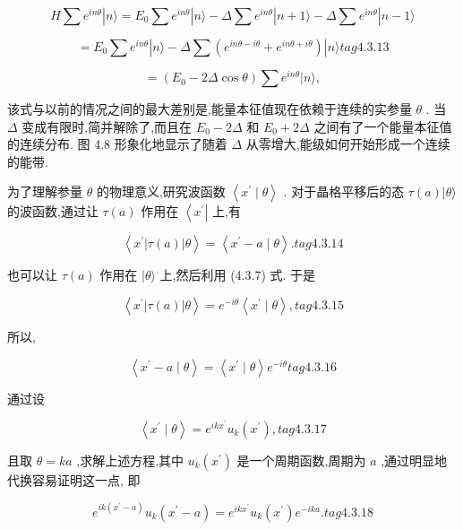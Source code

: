 $$
H\sum {e}^{in\theta }\left| {n\rangle = {E}_{0}\sum {e}^{in\theta }}\right| n\rangle - \Delta \sum {e}^{in\theta }\left| {n + 1\rangle - \Delta \sum {e}^{in\theta }}\right| n - 1\rangle
$$

$$
= {E}_{0}\sum {e}^{in\theta }\left| {n\rangle - \Delta \sum \left( {{e}^{{in\theta } - {i\theta }} + {e}^{{in\theta } + {i\theta }}}\right) }\right| n\rangle tag{4.3.13}
$$

$$
= \left( {{E}_{0} - {2\Delta }\cos \theta }\right) \sum {e}^{in\theta }|n\rangle ,
$$

该式与以前的情况之间的最大差别是,能量本征值现在依赖于连续的实参量 $\theta$ . 当 $\Delta$ 变成有限时,简并解除了,而且在 ${E}_{0} - {2\Delta }$ 和 ${E}_{0} + {2\Delta }$ 之间有了一个能量本征值的连续分布. 图 4.8 形象化地显示了随着 $\Delta$ 从零增大,能级如何开始形成一个连续的能带.

为了理解参量 $\theta$ 的物理意义,研究波函数 $\left\langle {{x}^{\prime } \mid \theta }\right\rangle$ . 对于晶格平移后的态 $\tau \left( a\right) |\theta \rangle$ 的波函数,通过让 $\tau \left( a\right)$ 作用在 $\left\langle {x}^{\prime }\right|$ 上,有

$$
\left\langle {{x}^{\prime }\left| {\tau \left( a\right) }\right| \theta }\right\rangle = \left\langle {{x}^{\prime } - a \mid \theta }\right\rangle . tag{4.3.14}
$$

也可以让 $\tau \left( a\right)$ 作用在 $|\theta \rangle$ 上,然后利用 (4.3.7) 式. 于是

$$
\left\langle {{x}^{\prime }\left| {\tau \left( a\right) }\right| \theta }\right\rangle = {e}^{-{i\theta }}\left\langle {{x}^{\prime } \mid \theta }\right\rangle , tag{4.3.15}
$$

所以,

$$
\left\langle {{x}^{\prime } - a \mid \theta }\right\rangle = \left\langle {{x}^{\prime } \mid \theta }\right\rangle {e}^{-{i\theta }} tag{4.3.16}
$$

通过设

$$
\left\langle {{x}^{\prime } \mid \theta }\right\rangle = {e}^{{ik}{x}^{\prime }}{u}_{k}\left( {x}^{\prime }\right) , tag{4.3.17}
$$

且取 $\theta = {ka}$ ,求解上述方程,其中 ${u}_{k}\left( {x}^{\prime }\right)$ 是一个周期函数,周期为 $a$ ,通过明显地代换容易证明这一点, 即

$$
{e}^{{ik}\left( {{x}^{\prime } - a}\right) }{u}_{k}\left( {{x}^{\prime } - a}\right) = {e}^{{ik}{x}^{\prime }}{u}_{k}\left( {x}^{\prime }\right) {e}^{-{ika}}. tag{4. 3.18}
$$



